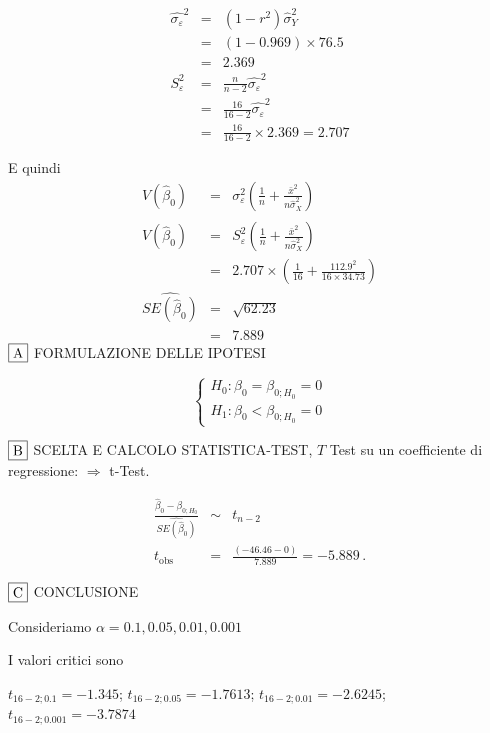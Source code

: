 \documentclass[
  11pt,
]{book}
\theoremstyle{mytheoremstyle}
\theoremstyle{mydefstyle}
\newenvironment{sol}
  {
  \begin{tcolorbox}[enhanced,breakable,arc=0.1mm,boxrule=1pt,colback=white,colframe=iblue,
  title=\bf \fontfamily{lmss}\selectfont \hspace{.5 cm} Soluzione,drop fuzzy shadow]

}{
\end{tcolorbox}
  }
\begin{document}
\begin{sol}
\begin{eqnarray*}
\hat{\sigma_\varepsilon}^2&=&(1-r^2)\hat\sigma_Y^2\\
&=& (1- 0.969 )\times 76.5 \\
   &=&  2.369 \\
   S_\varepsilon^2 &=& \frac{n} {n-2} \hat{\sigma_\varepsilon}^2\\
   &=&  \frac{ 16 } { 16 -2} \hat{\sigma_\varepsilon}^2 \\
 &=&  \frac{ 16 } { 16 -2} \times  2.369  =  2.707  
\end{eqnarray*}

E quindi\begin{eqnarray*}
V(\hat\beta_{0}) &=& \sigma_{\varepsilon}^{2} \left( \frac{1} {n}  +  \frac{\bar{x}^{2}} {n \hat{\sigma}^{2}_{X}} \right)\\
\widehat{V(\hat\beta_{0})} &=& S_{\varepsilon}^{2}\left( \frac{1} {n}  +  \frac{\bar{x}^{2}} {n \hat{\sigma}^{2}_{X}} \right)\ \\
 &=&  2.707 \times\left( \frac{1} { 16 }  +  \frac{ 112.9 ^{2}} { 16 \times  34.73 } \right)\\
 \widehat{SE(\hat\beta_{0})}        &=&  \sqrt{ 62.23 }\\
 &=&  7.889 
\end{eqnarray*}
\(\fbox{A}\) FORMULAZIONE DELLE IPOTESI

\[\begin{cases}
   H_0: \beta_0 = \beta_{0;H_0}=0 \\
   H_1: \beta_0 < \beta_{0;H_0}=0 
   \end{cases}\]

\(\fbox{B}\) SCELTA E CALCOLO STATISTICA-TEST, \(T\)
Test su un coefficiente di regressione: \(\Rightarrow\) t-Test.

\begin{eqnarray*}
 \frac{\hat\beta_{ 0 } - \beta_{ 0 ;H_0}} {\widehat{SE(\hat\beta_{ 0 })}}&\sim&t_{n-2}\\
   t_{\text{obs}}
&=& \frac{ ( -46.46 -  0 )} { 7.889 }
 =   -5.889 \, .
\end{eqnarray*}

\(\fbox{C}\) CONCLUSIONE

Consideriamo \(\alpha=0.1, 0.05, 0.01, 0.001\)

I valori critici sono

\(t_{16-2;0.1}=-1.345\); \(t_{16-2;0.05}=-1.7613\); \(t_{16-2;0.01}=-2.6245\); \(t_{16-2;0.001}=-3.7874\)


\end{sol}
\end{document}
